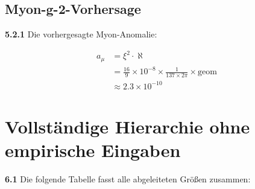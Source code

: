 \documentclass[12pt,a4paper]{article}
\newcommand{\xipar}{\xi}
\begin{document}
\subsection{Myon-g-2-Vorhersage}

\noindent \textbf{5.2.1} Die vorhergesagte Myon-Anomalie:
\begin{keyresult}
	\begin{align}
		a_\mu &= \xipar^2 \cdot \aleph \\
		&= \frac{16}{9} \times 10^{-8} \times \frac{1}{137 \times 2\pi} \times \text{geom} \\
		&\approx 2.3 \times 10^{-10}
	\end{align}
\end{keyresult}

\section{Vollständige Hierarchie ohne empirische Eingaben}

\noindent \textbf{6.1} Die folgende Tabelle fasst alle abgeleiteten Größen zusammen:
\end{document}
